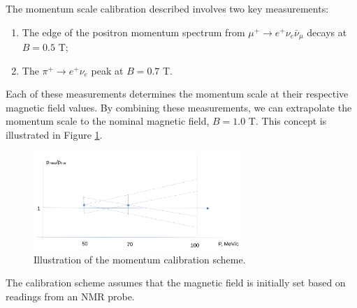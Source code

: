 The momentum scale calibration described involves two key measurements: 
\begin{enumerate}
    \item The edge of the positron momentum spectrum 
    from $\mu^+ \rightarrow e^+ \nu_e \bar{\nu}_\mu$ decays 
    at $B = 0.5$ T;
    \item The $\pi^+ \rightarrow e^+ \nu_e$ peak at $B = 0.7$ T.
\end{enumerate}

Each of these measurements determines the momentum scale at their respective 
magnetic field values. By combining these measurements, we can extrapolate the 
momentum scale to the nominal magnetic field, $B = 1.0$ T. This concept is illustrated in Figure \ref{fig:momscale}.

\begin{figure}[!h]
\centering
\includegraphics[width=0.7\textwidth]{figures/png/Screenshot_20240909_140555.png}
\caption[The momentum calibration scheme.]{Illustration of the momentum calibration scheme.}
\label{fig:momscale}
\end{figure}

The calibration scheme assumes that the magnetic field is initially set based 
on readings from an NMR probe.


